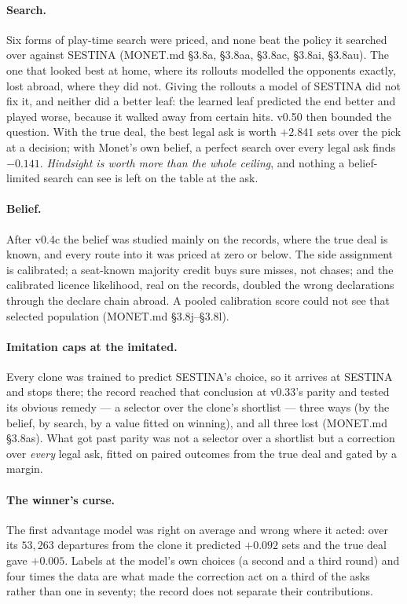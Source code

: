 \documentclass[11pt]{article}
\newcommand{\monet}{MONET.md}
\newcommand{\sect}[1]{\S#1}
\begin{document}
\paragraph{Search.} Six forms of play-time search were priced, and none beat the policy it searched
over against SESTINA (\monet{} \sect{3.8a}, \sect{3.8aa}, \sect{3.8ac}, \sect{3.8ai}, \sect{3.8au}). The
one that looked best at home, where its rollouts modelled the opponents exactly, lost abroad, where
they did not. Giving the rollouts a model of SESTINA did not fix it, and neither did a better leaf:
the learned leaf predicted the end better and played worse, because it walked away from certain hits.
v0.50 then bounded the question. With the true deal, the best legal ask is worth $+2.841$ sets over
the pick at a decision; with Monet's own belief, a perfect search over every legal ask finds
$-0.141$. \emph{Hindsight is worth more than the whole ceiling}, and nothing a belief-limited search
can see is left on the table at the ask.

\paragraph{Belief.} After v0.4c the belief was studied mainly on the records, where the true deal is
known, and every route into it was priced at zero or below. The side assignment is calibrated; a
seat-known majority credit buys sure misses, not chases; and the calibrated licence likelihood, real
on the records, doubled the wrong declarations through the declare chain abroad. A pooled calibration
score could not see that selected population (\monet{} \sect{3.8j}--\sect{3.8l}).

\paragraph{Imitation caps at the imitated.} Every clone was trained to predict SESTINA's choice, so
it arrives at SESTINA and stops there; the record reached that conclusion at v0.33's parity and
tested its obvious remedy --- a selector over the clone's shortlist --- three ways (by the belief, by
search, by a value fitted on winning), and all three lost (\monet{} \sect{3.8as}). What got past parity
was not a selector over a shortlist but a correction over \emph{every} legal ask, fitted on paired
outcomes from the true deal and gated by a margin.

\paragraph{The winner's curse.} The first advantage model was right on average and wrong where it
acted: over its $53{,}263$ departures from the clone it predicted $+0.092$ sets and the true deal gave
$+0.005$. Labels at the model's own choices (a second and a third round) and four times the data are
what made the correction act on a third of the asks rather than one in seventy; the record does not
separate their contributions.
\end{document}
